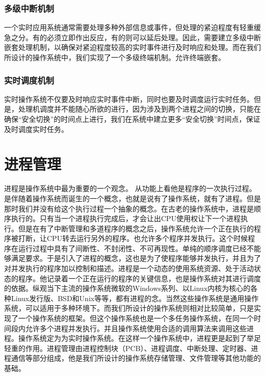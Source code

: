 \documentclass[UTF8,nofonts,cs4size]{ctexrep}
\begin{document}
\subsubsection{多级中断机制}
一个实时应用系统通常需要处理多种外部信息或事件，但处理的紧迫程度有轻重缓急之分。有的必须立即作出反应，有的则可以延后处理。因此，需要建立多级中断嵌套处理机制，以确保对紧迫程度较高的实时事件进行及时响应和处理。而在我们所设计的操作系统中，我们实现了一个多级终端机制。允许终端嵌套。
\subsubsection{实时调度机制}
实时操作系统不仅要及时响应实时事件中断，同时也要及时调度运行实时任务。但是，处理机调度并不能随心所欲的进行，因为涉及到两个进程之间的切换，只能在确保“安全切换”的时间点上进行，我们在系统中建立更多“安全切换”时间点，保证及时调度实时任务。
\section{进程管理}
进程是操作系统中最为重要的一个观念。                                                                                                                                                                                                                                                                                                                                                                                                                                                                                                                                                                                                                                                                                                                                                                                                                                                                                 从功能上看他是程序的一次执行过程。是伴随着操作系统而诞生的一个概念，也就是说有了操作系统，就有了进程。但是那时我们并没有给这个执行过程一个抽象的概念。在古老的操作系统中，进程是顺序执行的。只有当一个进程执行完成后，才会让出CPU使用权让下一个进程执行。但是在有了中断管理和多道程序的概念之后，操作系统允许一个正在执行的程序被打断，让CPU转去运行另外的程序。也允许多个程序并发执行。这个时候程序在运行过程中具有了间断性、不封闭性、不可再现性。单纯的顺序调度已经不能够满足要求。于是引入了进程的概念，这也是为了使程序能够并发执行，并且为了对并发执行的程序加以控制和描述。进程是一个动态的使用系统资源、处于活动状态的程序。他记录着一个正在运行的程序的关键信息，也是操作系统对其进行调度的依据。纵观当下主流的操作系统微软的Windows系列、以Linux内核为核心的各种Linux发行版、BSD和Unix等等，都有进程的念。当然这些操作系统是通用操作系统，可以适用于多种环境下。而我们所设计的操作系统则相对比较简单，只是实现了一个操作系统的框架。但这个操作系统也是一个多任务操作系统，在同一个时间段内允许多个进程并发执行。并且操作系统使用合适的调用算法来调用这些进程。操作系统定为为实时操作系统。在这样一个操作系统中，进程更是起到了举足轻重的作用。进程管理由进程控制块（PCB）、进程调度、中断处理、定时器、进程通信等部分组成，他是我们所设计的操作系统存储管理、文件管理等其他功能的基础。
\end{document}
